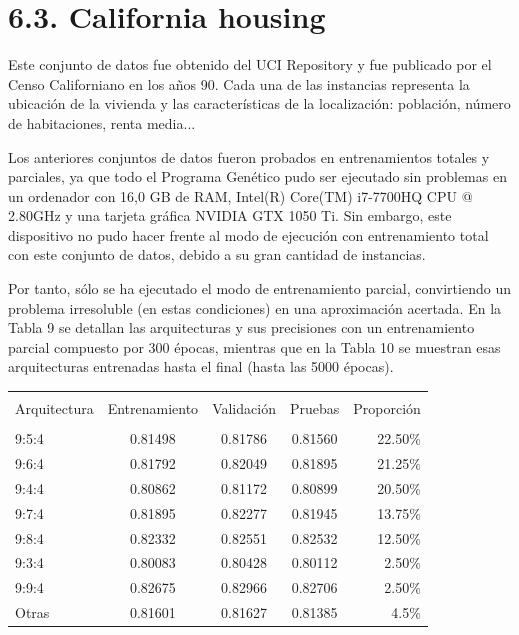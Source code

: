 \documentclass[spanish,a4paper,12pt,twoside]{report}
\begin{document}
  \section*{\Large 6.3. California housing}
  Este conjunto de datos fue obtenido del UCI Repository y fue publicado por el Censo Californiano en los años 90. Cada una de las instancias representa la ubicación de la vivienda y las características de la localización: población, número de habitaciones, renta media... \par
  Los anteriores conjuntos de datos fueron probados en entrenamientos totales y parciales, ya que todo el Programa Genético pudo ser ejecutado sin problemas en un ordenador con 16,0 GB de RAM, Intel(R) Core(TM) i7-7700HQ CPU @ 2.80GHz y una tarjeta gráfica NVIDIA GTX 1050 Ti. Sin embargo, este dispositivo no pudo hacer frente al modo de ejecución con entrenamiento total con este conjunto de datos, debido a su gran cantidad de instancias. \par
  Por tanto, sólo se ha ejecutado el modo de entrenamiento parcial, convirtiendo un problema irresoluble (en estas condiciones) en una aproximación acertada. En la Tabla 9 se detallan las arquitecturas y sus precisiones con un entrenamiento parcial compuesto por 300 épocas, mientras que en la Tabla 10 se muestran esas arquitecturas entrenadas hasta el final (hasta las 5000 épocas).
\begin{center}
   \label{table}
  \begin{tabular}{l c c c r}
    \hline \\ [-2ex]
    Arquitectura & Entrenamiento & Validación & Pruebas & Proporción \\ [0.5ex]
    \hline \\ [-1ex]
    9:5:4 & 0.81498 & 0.81786 & 0.81560 & 22.50\% \\
    9:6:4 & 0.81792 & 0.82049 & 0.81895 & 21.25\% \\
    9:4:4 & 0.80862 & 0.81172 & 0.80899 & 20.50\% \\
    9:7:4 & 0.81895 & 0.82277 & 0.81945 & 13.75\% \\
    9:8:4 & 0.82332 & 0.82551 & 0.82532 & 12.50\% \\
    9:3:4 & 0.80083 & 0.80428 & 0.80112 & 2.50\% \\
    9:9:4 & 0.82675 & 0.82966 & 0.82706 & 2.50\% \\
    Otras & 0.81601 & 0.81627 & 0.81385 & 4.5\% \\ [1ex]
    \hline
  \end{tabular}
\end{center} \par
\end{document}
